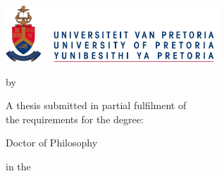 \begin{titlepage}
    \begin{center}
        \includegraphics[width=0.6\textwidth]{1-front-matter/up-logo.jpg}
        
        \vspace*{1cm}

        \Large
        \MakeUppercase{\textbf{\doctitle}}
        
        \vspace{0.5cm}
        \large
        by \\
        \vspace{0.5cm}
            
        \authorname
            
        \vfill
            
        A thesis submitted in partial fulfilment of \\
        the requirements for the degree: \\
        
        \vspace{1cm}
        
        Doctor of Philosophy
            
        \vspace{1cm}
            
        in the \\
        \vspace{0.5cm}            
        
        \large
        \faculty \\
        \vspace{0.5cm}
        
        \department \\
        \vspace{0.5cm}

        \university \\
        \country \\
        \vspace{0.5cm}
        \submissiondate
            
    \end{center}
\end{titlepage}